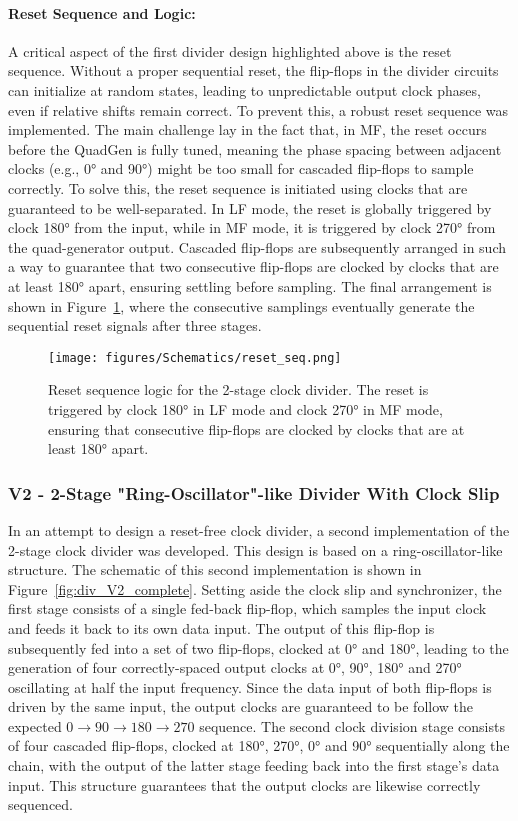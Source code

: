 \paragraph{Reset Sequence and Logic:}
A critical aspect of the first divider design highlighted above is the reset sequence. Without a proper sequential reset, the flip-flops in the divider circuits can initialize at random states, leading to unpredictable output clock phases, even if relative shifts remain correct. To prevent this, a robust reset sequence was implemented.
The main challenge lay in the fact that, in MF, the reset occurs before the QuadGen is fully tuned, meaning the phase spacing between adjacent clocks (e.g., \ang{0} and \ang{90}) might be too small for cascaded flip-flops to sample correctly. To solve this, the reset sequence is initiated using clocks that are guaranteed to be well-separated. 
In LF mode, the reset is globally triggered by clock \ang{180} from the input, while in MF mode, it is triggered by clock \ang{270} from the quad-generator output. 
Cascaded flip-flops are subsequently arranged in such a way to guarantee that two consecutive flip-flops are clocked by clocks that are at least \ang{180} apart, ensuring settling before sampling. The final arrangement is shown in Figure~\ref{fig:reset_seq}, where the consecutive samplings eventually generate the sequential reset signals after three stages.
\begin{figure}[h]
  \centering
  \texttt{[image: figures/Schematics/reset\_seq.png]}
  \caption{Reset sequence logic for the 2-stage clock divider. The reset is triggered by clock \ang{180} in LF mode and clock \ang{270} in MF mode, ensuring that consecutive flip-flops are clocked by clocks that are at least \ang{180} apart.}
  \label{fig:reset_seq}
\end{figure}
\subsubsection{V2 - 2-Stage "Ring-Oscillator"-like Divider With Clock Slip}
In an attempt to design a reset-free clock divider, a second implementation of the 2-stage clock divider was developed. This design is based on a ring-oscillator-like structure. The schematic of this second implementation is shown in Figure~\ref{fig:div_V2_complete}. 
Setting aside the clock slip and synchronizer, the first stage consists of a single fed-back flip-flop, which samples the input clock and feeds it back to its own data input. The output of this flip-flop is subsequently fed into a set of two flip-flops, clocked at \ang{0} and \ang{180}, leading to the generation of four correctly-spaced output clocks at \ang{0}, \ang{90}, \ang{180} and \ang{270} oscillating at half the input frequency. 
Since the data input of both flip-flops is driven by the same input, the output clocks are guaranteed to be follow the expected \(0\rightarrow 90\rightarrow 180\rightarrow 270\) sequence.
The second clock division stage consists of four cascaded flip-flops, clocked at \ang{180}, \ang{270}, \ang{0} and \ang{90} sequentially along the chain, with the output of the latter stage feeding back into the first stage's data input. This structure guarantees that the output clocks are likewise correctly sequenced.
